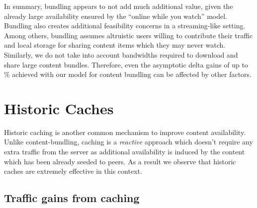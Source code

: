 \documentclass[10pt, conference, letterpaper]{IEEEtran}
\begin{document}
In summary, bundling appears to not add much additional value, given the already large availability ensured by the ``online while you watch'' model. Bundling also creates additional feasibility concerns in a streaming-like setting.  Among others, bundling assumes altruistic users willing to contribute their traffic and local storage for sharing content items which they may never watch. Similarly, we do not take into account bandwidths required to download and share large content bundles. Therefore, even the asymptotic delta gains of up to \% achieved with our model for content bundling can be affected by other factors. 
 \section{Historic Caches}

Historic caching is another common mechanism to improve content availability. Unlike content-bundling, caching is a \emph{reactive} approach which doesn't require any extra traffic from the server as additional availability is induced by the content which has been already seeded to peers. As a result we observe that historic caches are extremely effective in this context. 



















\subsection{Traffic gains from caching}
\end{document}
